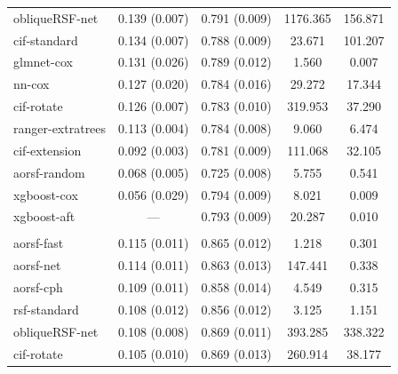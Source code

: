 \documentclass{article}\usepackage[]{graphicx}\usepackage[]{xcolor}
\newenvironment{knitrout}{}{} %
\begin{document}
\begin{knitrout}
\begin{longtable}[t]{lcccc}
\hspace{1em}obliqueRSF-net & 0.139 (0.007) & 0.791 (0.009) & 1176.365 & 156.871\\
\hspace{1em}cif-standard & 0.134 (0.007) & 0.788 (0.009) & 23.671 & 101.207\\
\hspace{1em}glmnet-cox & 0.131 (0.026) & 0.789 (0.012) & 1.560 & 0.007\\
\hspace{1em}nn-cox & 0.127 (0.020) & 0.784 (0.016) & 29.272 & 17.344\\
\hspace{1em}cif-rotate & 0.126 (0.007) & 0.783 (0.010) & 319.953 & 37.290\\
\hspace{1em}ranger-extratrees & 0.113 (0.004) & 0.784 (0.008) & 9.060 & 6.474\\
\hspace{1em}cif-extension & 0.092 (0.003) & 0.781 (0.009) & 111.068 & 32.105\\
\hspace{1em}aorsf-random & 0.068 (0.005) & 0.725 (0.008) & 5.755 & 0.541\\
\hspace{1em}xgboost-cox & 0.056 (0.029) & 0.794 (0.009) & 8.021 & 0.009\\
\hspace{1em}xgboost-aft & --- & 0.793 (0.009) & 20.287 & 0.010\\
\addlinespace[0.3em]
\multicolumn{5}{l}{\textit{\textbf{MESA; heart failure, n = 6785, p = 48}}}\\
\hline
\hspace{1em}aorsf-fast & 0.115 (0.011) & 0.865 (0.012) & 1.218 & 0.301\\
\hspace{1em}aorsf-net & 0.114 (0.011) & 0.863 (0.013) & 147.441 & 0.338\\
\hspace{1em}aorsf-cph & 0.109 (0.011) & 0.858 (0.014) & 4.549 & 0.315\\
\hspace{1em}rsf-standard & 0.108 (0.012) & 0.856 (0.012) & 3.125 & 1.151\\
\hspace{1em}obliqueRSF-net & 0.108 (0.008) & 0.869 (0.011) & 393.285 & 338.322\\
\hspace{1em}cif-rotate & 0.105 (0.010) & 0.869 (0.013) & 260.914 & 38.177\\

\end{longtable}
\end{knitrout}
\end{document}

